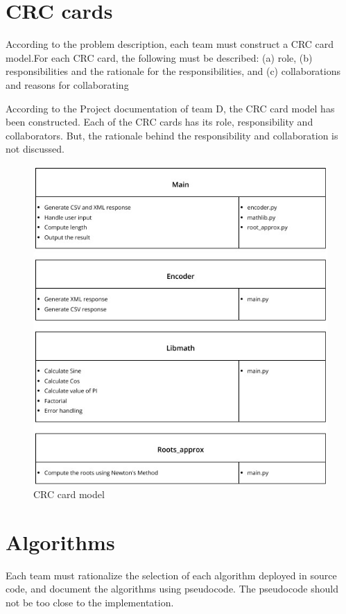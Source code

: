 \section{CRC cards}
\begin{flushleft}
According to the problem description, each team must construct a CRC card model.For each CRC card, the following must be described: (a) role, (b) responsibilities and the 
rationale for the responsibilities, and (c) collaborations and reasons for collaborating
\end{flushleft}
\begin{flushleft}
    According to the Project documentation of team D, the CRC card model has been constructed. Each of the CRC cards has its role, responsibility and collaborators. But, the rationale behind the responsibility and collaboration is not discussed. 
\end{flushleft}
\begin{figure}[h!]
    \centering
    \includegraphics[width=.5\linewidth]{resources/crc_card_team_e.jpg}
    \vspace{.5cm}
    \caption{CRC card model}
    \label{fig:CRC card }
  \end{figure}
  \pagebreak
  \section{Algorithms}
\begin{flushleft}
    Each team must rationalize the selection of each algorithm deployed in source code, and document the 
algorithms using pseudocode. The pseudocode should not be too close to the implementation. 
\end{flushleft}

